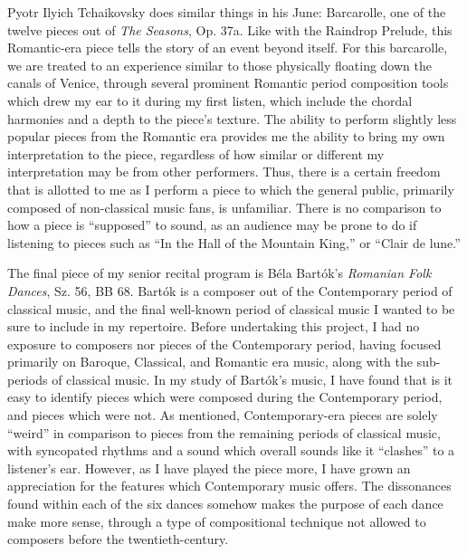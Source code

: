 Pyotr Ilyich Tchaikovsky does similar things in his June: Barcarolle, one of the twelve pieces out of \textit{The Seasons}, Op. 37a. Like with the Raindrop Prelude, this Romantic-era piece tells the story of an event beyond itself. For this barcarolle, we are treated to an experience similar to those physically floating down the canals of Venice, through several prominent Romantic period composition tools which drew my ear to it during my first listen, which include the chordal harmonies and a depth to the piece's texture. The ability to perform slightly less popular pieces from the Romantic era provides me the ability to bring my own interpretation to the piece, regardless of how similar or different my interpretation may be from other performers. Thus, there is a certain freedom that is allotted to me as I perform a piece to which the general public, primarily composed of non-classical music fans, is unfamiliar. There is no comparison to how a piece is ``supposed'' to sound, as an audience may be prone to do if listening to pieces such as ``In the Hall of the Mountain King,'' or ``Clair de lune.''

The final piece of my senior recital program is Béla Bartók's \textit{Romanian Folk Dances}, Sz. 56, BB 68. Bartók is a composer out of the Contemporary period of classical music, and the final well-known period of classical music I wanted to be sure to include in my repertoire. Before undertaking this project, I had no exposure to composers nor pieces of the Contemporary period, having focused primarily on Baroque, Classical, and Romantic era music, along with the sub-periods of classical music. In my study of Bartók's music, I have found that is it easy to identify pieces which were composed during the Contemporary period, and pieces which were not. As mentioned, Contemporary-era pieces are solely ``weird'' in comparison to pieces from the remaining periods of classical music, with syncopated rhythms and a sound which overall sounds like it ``clashes'' to a listener's ear. However, as I have played the piece more, I have grown an appreciation for the features which Contemporary music offers. The dissonances found within each of the six dances somehow makes the purpose of each dance make more sense, through a type of compositional technique not allowed to composers before the twentieth-century. 